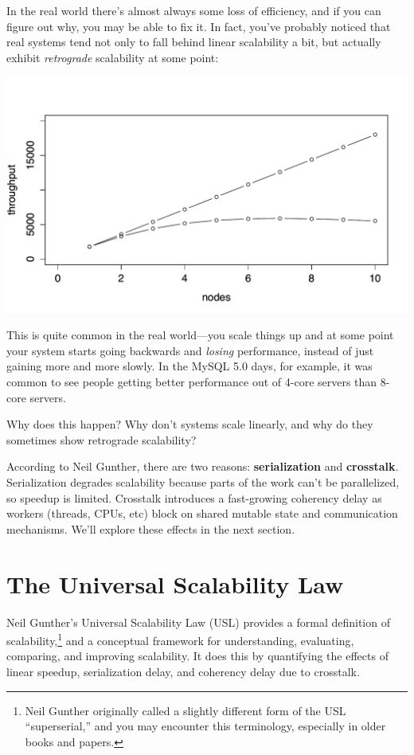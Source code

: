 \documentclass{vivid_layout}
\begin{document}
In the real world there's almost always some loss of efficiency, and if you can
figure out why, you may be able to fix it. In fact, you've probably noticed that
real systems tend not only to fall behind linear scalability a bit, but actually
exhibit {\itshape retrograde} scalability at some point:
\begin{center}
\includegraphics[width=.85\linewidth]{scalability/linear3}
\end{center}
This is quite common in the real world---you scale things up and at some point
your system starts going backwards and {\itshape losing} performance, instead of
just gaining more and more slowly. In the MySQL 5.0 days, for example, it was
common to see people getting better performance out of 4-core servers than
8-core servers.

Why does this happen? Why don't systems scale linearly, and why do they
sometimes show retrograde scalability?

According to Neil Gunther, there are two reasons: {\bfseries serialization} and
{\bfseries crosstalk}. Serialization degrades scalability because parts of the
work can't be parallelized, so speedup is limited. Crosstalk introduces a
fast-growing coherency delay as workers (threads, CPUs, etc) block on shared
mutable state and communication mechanisms. We'll explore these effects in the
next section.

\section{The Universal Scalability Law}

Neil Gunther's Universal Scalability Law (USL) provides a formal definition of
scalability,\footnote{Neil Gunther originally called a slightly different form
of the USL ``superserial,'' and you may encounter this terminology, especially
in older books and papers.} and a conceptual framework for understanding,
evaluating, comparing, and improving scalability. It does this by quantifying
the effects of linear speedup, serialization delay, and coherency delay due to
crosstalk.
\end{document}
